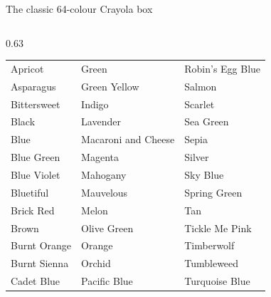 \documentclass[aspectratio=169,11pt]{beamer}
\begin{document}
\begin{frame}[t]{The classic 64-colour Crayola box}
\begin{minipage}{0.95\textwidth}
\begin{columns}[T,onlytextwidth]
\begin{column}{0.63\textwidth}
      \begin{tabular}{@{}lll@{}}
        \textcolor{cray0}{Apricot} & \textcolor{cray1}{Green} & \textcolor{cray2}{Robin's Egg Blue} \\
        \textcolor{cray3}{Asparagus} & \textcolor{cray4}{Green Yellow} & \textcolor{cray5}{Salmon} \\
        \textcolor{cray6}{Bittersweet} & \textcolor{cray7}{Indigo} & \textcolor{cray8}{Scarlet} \\
        \textcolor{cray9}{Black} & \textcolor{cray10}{Lavender} & \textcolor{cray11}{Sea Green} \\
        \textcolor{cray12}{Blue} & \textcolor{cray13}{Macaroni and Cheese} & \textcolor{cray14}{Sepia} \\
        \textcolor{cray15}{Blue Green} & \textcolor{cray16}{Magenta} & \textcolor{cray17}{Silver} \\
        \textcolor{cray18}{Blue Violet} & \textcolor{cray19}{Mahogany} & \textcolor{cray20}{Sky Blue} \\
        \textcolor{cray21}{Bluetiful} & \textcolor{cray22}{Mauvelous} & \textcolor{cray23}{Spring Green} \\
        \textcolor{cray24}{Brick Red} & \textcolor{cray25}{Melon} & \textcolor{cray26}{Tan} \\
        \textcolor{cray27}{Brown} & \textcolor{cray28}{Olive Green} & \textcolor{cray29}{Tickle Me Pink} \\
        \textcolor{cray30}{Burnt Orange} & \textcolor{cray31}{Orange} & \textcolor{cray32}{Timberwolf} \\
        \textcolor{cray33}{Burnt Sienna} & \textcolor{cray34}{Orchid} & \textcolor{cray35}{Tumbleweed} \\
        \textcolor{cray36}{Cadet Blue} & \textcolor{cray37}{Pacific Blue} & \textcolor{cray38}{Turquoise Blue} \\

\end{tabular}
\end{column}
\end{columns}
\end{minipage}
\end{frame}
\end{document}

